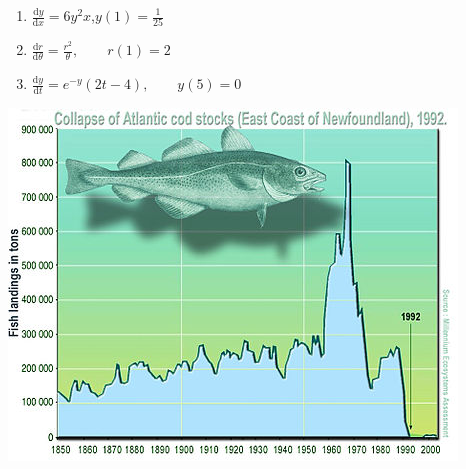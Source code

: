 \begin{enumerate}
\begin{enumerate}
    \item $\frac{\mathrm d y}{\mathrm d x} = 6y^2x$,\qquad $y(1) = \frac{1}{25}$

    \item $\frac{\mathrm d r}{\mathrm d \theta} = \frac{r^2}{\theta},\qquad r(1) = 2 $  

    \item $\frac{\mathrm d y}{\mathrm d t} = e^{-y}(2t-4),\qquad y(5)=0$ 
\end{enumerate}





\clearpage
\centering 
\includegraphics[scale=1.8]{resources/fish.jpeg}


\end{enumerate}
